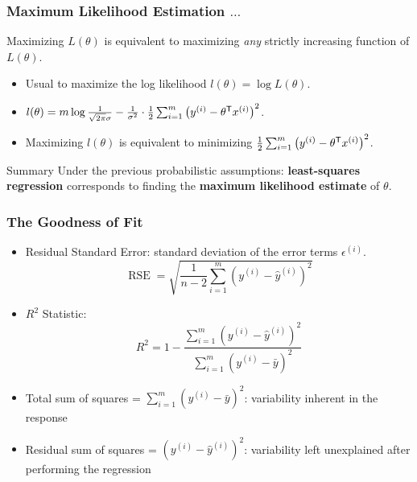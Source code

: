 \documentclass[xcolor=table]{beamer}
\newcommand{\trans}[1]{\ensuremath{#1}^{\scriptsize{\textsf{T}}}}
\DeclareMathOperator{\RSE}{RSE}
\begin{document}
\begin{frame}[t]
\frametitle{Maximum Likelihood Estimation $\ldots$}
Maximizing $L(\theta)$ is equivalent to maximizing \emph{any} strictly increasing 
function of $L(\theta)$.

\pause

\begin{itemize}
    \item Usual to maximize the log likelihood $l(\theta) = \log L(\theta)$.

    \item $l(\theta) = m \log \frac{1}{\sqrt{2 \pi} \sigma} - 
                        \frac{1}{\sigma^2} \cdot \frac{1}{2} 
                            \sum_{i = 1}^{m}{\left ( y^{(i)} - \trans{\theta} x^{(i)} \right ) ^2}$.
    \item Maximizing $l(\theta)$ is equivalent to minimizing 
        $\frac{1}{2} \sum_{i = 1}^{m}{\left ( y^{(i)} - \trans{\theta} x^{(i)} \right ) ^2}$.
\end{itemize} 

\pause

\bigskip

\begin{block}{Summary}
Under the previous probabilistic assumptions: \textbf{least-squares regression} 
corresponds to finding the \textbf{maximum likelihood estimate} of $\theta$.
\end{block}
\end{frame}

\begin{frame}[t]
\frametitle{The Goodness of Fit}
\begin{itemize}
    \item Residual Standard Error: standard deviation of the error terms $\epsilon^{(i)}$.
    \[
        \RSE = \sqrt{\frac{1}{n - 2} \sum_{i = 1}^{m} \left ( y^{(i)} - \hat{y}^{(i)} \right )^2}
    \]

    \pause

    \item $R^2$ Statistic: 
    \[
        R^2 = 1 - \frac{ \sum_{i = 1}^{m} \left ( y^{(i)} - \hat{y}^{(i)} \right )^2}{ \sum_{i = 1}^{m} \left ( y^{(i)} - \bar{y} \right )^2}
    \]
\end{itemize}

\pause

\begin{itemize}
    \item Total sum of squares = $\sum_{i = 1}^{m} \left ( y^{(i)} - \bar{y} \right )^2$: variability 
        inherent in the response  
    
    \item Residual sum of squares = $\left ( y^{(i)} - \hat{y}^{(i)} \right )^2$: variability left 
        unexplained after performing the regression  
\end{itemize}
\end{frame}
\end{document}
